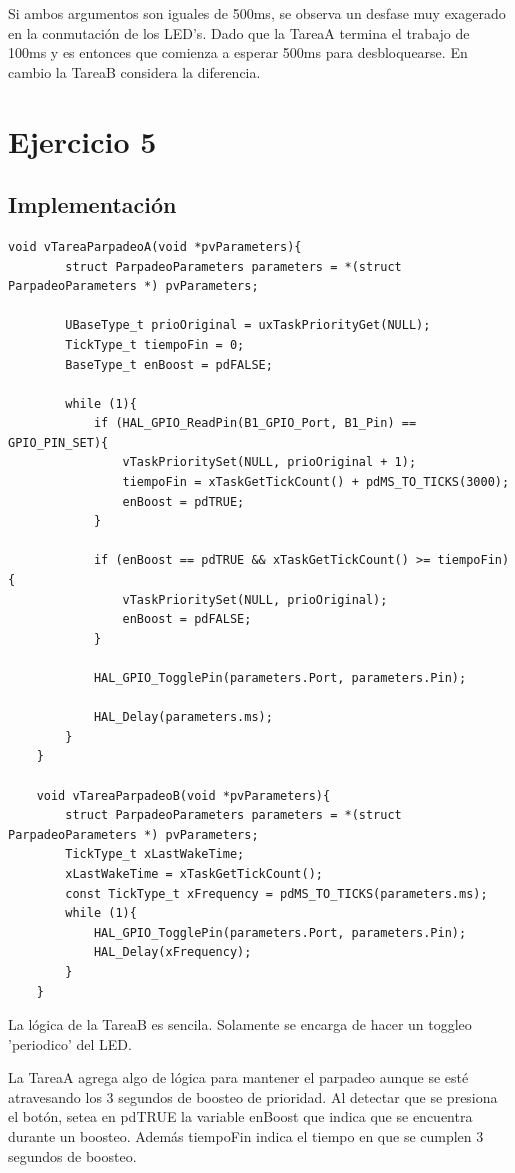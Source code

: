 \documentclass[12pt]{article}
\begin{document}
Si ambos argumentos son iguales de 500ms, se observa
un desfase muy exagerado en la conmutación de los LED's. Dado
que la TareaA termina el trabajo de 100ms y es entonces que comienza
a esperar 500ms para desbloquearse.
En cambio la TareaB considera la diferencia.
\pagebreak
\section{Ejercicio 5}
\subsection{Implementación}
\begin{lstlisting}[style=CStyle]
    void vTareaParpadeoA(void *pvParameters){
        struct ParpadeoParameters parameters = *(struct ParpadeoParameters *) pvParameters;
    
        UBaseType_t prioOriginal = uxTaskPriorityGet(NULL);
        TickType_t tiempoFin = 0;
        BaseType_t enBoost = pdFALSE;
    
        while (1){
            if (HAL_GPIO_ReadPin(B1_GPIO_Port, B1_Pin) == GPIO_PIN_SET){
                vTaskPrioritySet(NULL, prioOriginal + 1);
                tiempoFin = xTaskGetTickCount() + pdMS_TO_TICKS(3000);
                enBoost = pdTRUE;
            }
    
            if (enBoost == pdTRUE && xTaskGetTickCount() >= tiempoFin){
                vTaskPrioritySet(NULL, prioOriginal);
                enBoost = pdFALSE;
            }
    
            HAL_GPIO_TogglePin(parameters.Port, parameters.Pin);
    
            HAL_Delay(parameters.ms);
        }
    }
    
    void vTareaParpadeoB(void *pvParameters){
        struct ParpadeoParameters parameters = *(struct ParpadeoParameters *) pvParameters;
        TickType_t xLastWakeTime;
        xLastWakeTime = xTaskGetTickCount();
        const TickType_t xFrequency = pdMS_TO_TICKS(parameters.ms);
        while (1){
            HAL_GPIO_TogglePin(parameters.Port, parameters.Pin);
            HAL_Delay(xFrequency);
        }
    }
\end{lstlisting}
La lógica de la TareaB es sencila. Solamente se 
encarga de hacer un toggleo 'periodico' del LED.

La TareaA agrega algo de lógica para mantener el 
parpadeo aunque se esté atravesando los 3 segundos de 
boosteo de prioridad. Al detectar que se presiona el botón,
setea en pdTRUE la variable enBoost que indica que se encuentra 
durante un boosteo. Además tiempoFin indica el tiempo en que 
se cumplen 3 segundos de boosteo.
\end{document}
